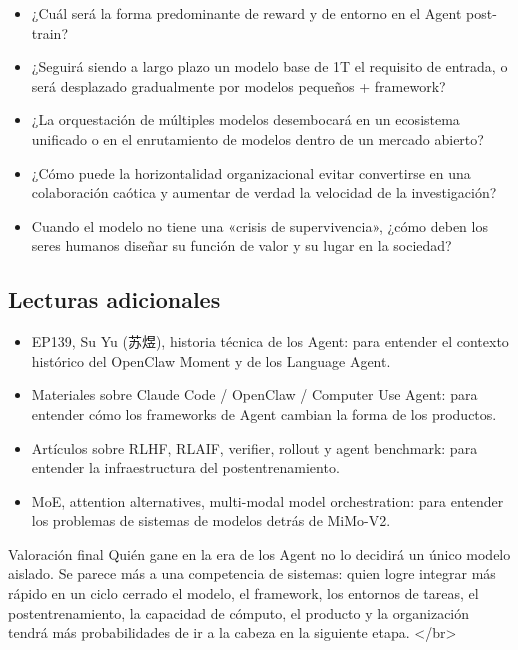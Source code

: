 \documentclass[a4paper]{article}
\begin{document}
\begin{itemize}
\item ¿Cuál será la forma predominante de reward y de entorno en el Agent post-train?
\item ¿Seguirá siendo a largo plazo un modelo base de 1T el requisito de entrada, o será desplazado gradualmente por modelos pequeños + framework?
\item ¿La orquestación de múltiples modelos desembocará en un ecosistema unificado o en el enrutamiento de modelos dentro de un mercado abierto?
\item ¿Cómo puede la horizontalidad organizacional evitar convertirse en una colaboración caótica y aumentar de verdad la velocidad de la investigación?
\item Cuando el modelo no tiene una «crisis de supervivencia», ¿cómo deben los seres humanos diseñar su función de valor y su lugar en la sociedad?
\end{itemize}

\subsection{Lecturas adicionales}

\begin{itemize}
\item EP139, Su Yu (苏煜), historia técnica de los Agent: para entender el contexto histórico del OpenClaw Moment y de los Language Agent.
\item Materiales sobre Claude Code / OpenClaw / Computer Use Agent: para entender cómo los frameworks de Agent cambian la forma de los productos.
\item Artículos sobre RLHF, RLAIF, verifier, rollout y agent benchmark: para entender la infraestructura del postentrenamiento.
\item MoE, attention alternatives, multi-modal model orchestration: para entender los problemas de sistemas de modelos detrás de MiMo-V2.
\end{itemize}

\begin{importantbox}{Valoración final}
Quién gane en la era de los Agent no lo decidirá un único modelo aislado. Se parece más a una competencia de sistemas: quien logre integrar más rápido en un ciclo cerrado el modelo, el framework, los entornos de tareas, el postentrenamiento, la capacidad de cómputo, el producto y la organización tendrá más probabilidades de ir a la cabeza en la siguiente etapa.
</br>
\end{importantbox}
\end{document}
